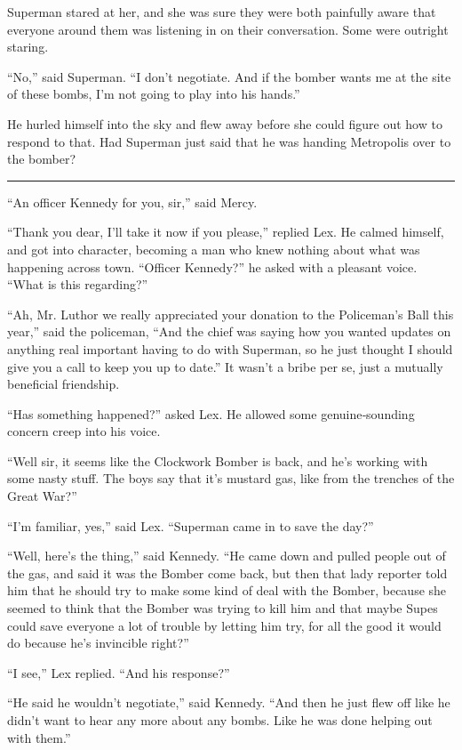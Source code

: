 Superman stared at her, and she was sure they were both painfully aware
that everyone around them was listening in on their conversation. Some
were outright staring.

``No,'' said Superman. ``I don't negotiate. And if the bomber wants me
at the site of these bombs, I'm not going to play into his hands.''

He hurled himself into the sky and flew away before she could figure out
how to respond to that. Had Superman just said that he was handing
Metropolis over to the bomber?

\begin{center}\rule{0.5\linewidth}{\linethickness}\end{center}

``An officer Kennedy for you, sir,'' said Mercy.

``Thank you dear, I'll take it now if you please,'' replied Lex. He
calmed himself, and got into character, becoming a man who knew nothing
about what was happening across town. ``Officer Kennedy?'' he asked with
a pleasant voice. ``What is this regarding?''

``Ah, Mr. Luthor we really appreciated your donation to the Policeman's
Ball this year,'' said the policeman, ``And the chief was saying how you
wanted updates on anything real important having to do with Superman, so
he just thought I should give you a call to keep you up to date.'' It
wasn't a bribe per se, just a mutually beneficial friendship.

``Has something happened?'' asked Lex. He allowed some genuine‐sounding
concern creep into his voice.

``Well sir, it seems like the Clockwork Bomber is back, and he's working
with some nasty stuff. The boys say that it's mustard gas, like from the
trenches of the Great War?''

``I'm familiar, yes,'' said Lex. ``Superman came in to save the day?''

``Well, here's the thing,'' said Kennedy. ``He came down and pulled
people out of the gas, and said it was the Bomber come back, but then
that lady reporter told him that he should try to make some kind of deal
with the Bomber, because she seemed to think that the Bomber was trying
to kill him and that maybe Supes could save everyone a lot of trouble by
letting him try, for all the good it would do because he's invincible
right?''

``I see,'' Lex replied. ``And his response?''

``He said he wouldn't negotiate,'' said Kennedy. ``And then he just flew
off like he didn't want to hear any more about any bombs. Like he was
done helping out with them.''

